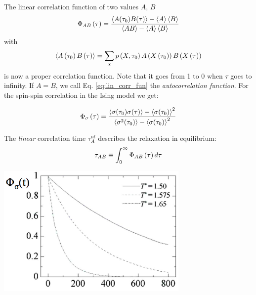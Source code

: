 The linear correlation function of two values $A$, $B$
\begin{equation}
\Phi_{AB}\left(\tau\right) = \frac {\left<A(\tau_0)B(\tau)\right>- \left<A\right>\left<B\right>}  {\left<A B\right>- \left<A\right>\left<B\right>}
\label{eq:lin_corr_fun}
\end{equation} with $$ \left<A\left(\tau_0\right) B\left(\tau\right)\right>     =  \sum_X{   p\left(X,\tau_0\right) A\left(X\left(\tau_0\right)\right) B \left(X\left(\tau\right)\right)     }$$
is now a proper correlation function. Note that it goes from 1 to 0 when $\tau$ goes to infinity. If $A=B$, we call Eq. \eqref{eq:lin_corr_fun} the \emph{autocorrelation function}. For the spin-spin correlation in the Ising model we get:

$$\Phi_{\sigma}\left(\tau\right) = \frac {\left<\sigma(\tau_0)\sigma(\tau)\right>- \left<\sigma(\tau_0)\right>^2} {\left<\sigma^2(\tau_0)\right>- \left<\sigma(\tau_0)\right>^2}$$

The \emph{linear} correlation time $\tau_A^{nl}$ describes the relaxation in equilibrium:
\begin{equation}
\tau_{AB} \equiv \int_0^{\infty} \Phi_{AB}\left(\tau\right) d\tau
\end{equation}

  \begin{center}
  \includegraphics[width=0.7\textwidth]{pics/spin_spin_fun}
  \label{fig:spin_spin_fun}
\end{center}

